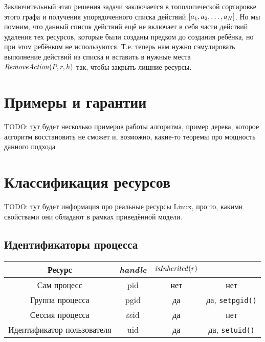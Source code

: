 Заключительный этап решения задачи заключается в топологической сортировке этого графа и получения упорядоченного списка действий $\left[ a_1, a_2, \ldots, a_{N} \right]$. Но мы помним, что данный список действий ещё не включает в себя части действий удаления тех ресурсов, которые были созданы предком до создания ребёнка, но при этом ребёнком не используются. Т.е. теперь нам нужно сэмулировать выполнение действий из списка и вставить в нужные места $\text{\textit{RemoveAction}}(P, r, h)$ так, чтобы закрыть лишние ресурсы.

\section{Примеры и гарантии}

TODO: тут будет несколько примеров работы алгоритма, пример дерева, которое алгоритм восстановить не сможет и, возможно, какие-то теоремы про мощность данного подхода

\section{Классификация ресурсов}

TODO: тут будет информация про реальные ресурсы Linux, про то, какими свойствами они обладают в рамках приведённой модели.

\subsection{Идентификаторы процесса}

\begin{table}[ht!]
\centering
\begin{tabular}{|c|c|c|c|}
	\hline
	\textbf{Ресурс} & \textit{\textbf{handle}} & $\text{\textit{isInherited}}(r)$ &\issharable{r} \\
	\hline
	\hline
	Сам процесс & pid & нет & нет \\
	\hline
	Группа процесса & pgid & да & да, \texttt{setpgid()} \\
	\hline
	Сессия процесса & ssid & да & нет \\
	\hline
	Идентификатор пользователя & uid & да & да, \texttt{setuid()} \\
	\hline
\end{tabular}
\end{table}
